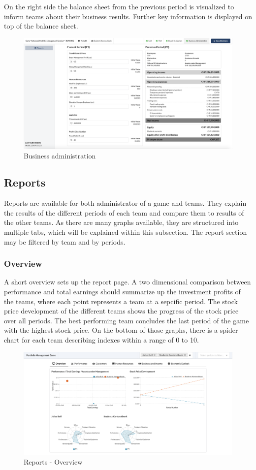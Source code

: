 On the right side the balance sheet from the previous period is visualized to inform teams about their business results. Further key information is displayed on top of the balance sheet.
\begin{figure}[h!]
  \centering
  \includegraphics[scale=0.2]{img/application-overview/teams/06_business.png}
  \caption{Business administration}
\end{figure}

\subsection{Reports}
Reports are available for both administrator of a game and teams. They explain the results of the different periods of each team and compare them to results of the other teams. As there are many graphs available, they are structured into multiple tabs, which will be explained within this subsection. The report section may be filtered by team and by periods.

\subsubsection{Overview}
A short overview sets up the report page. A two dimensional comparison between performance and total earnings should summarize up the investment profits of the teams, where each point represents a team at a sepcific period. The stock price development of the different teams shows the progress of the stock price over all periods. The best performing team concludes the last period of the game with the highest stock price. On the bottom of those graphs, there is a spider chart for each team describing indexes within a range of 0 to 10.
\begin{figure}[h!]
  \centering
  \includegraphics[scale=0.2]{img/application-overview/reports/01_overview.png}
  \caption{Reports - Overview}
\end{figure}

